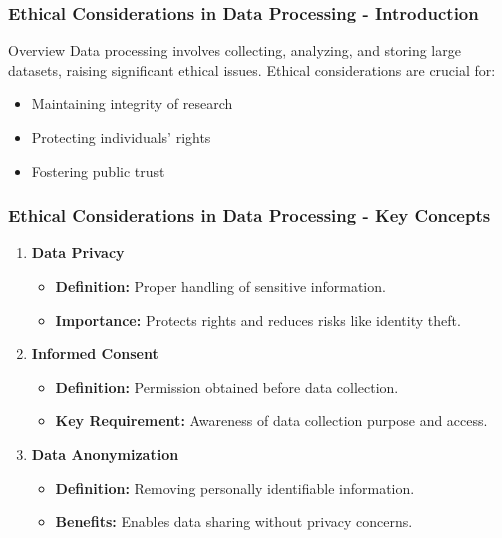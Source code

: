 \documentclass[aspectratio=169]{beamer}
\begin{document}
\begin{frame}[fragile]
    \frametitle{Ethical Considerations in Data Processing - Introduction}
    \begin{block}{Overview}
        Data processing involves collecting, analyzing, and storing large datasets, raising significant ethical issues. 
        Ethical considerations are crucial for:
        \begin{itemize}
            \item Maintaining integrity of research
            \item Protecting individuals’ rights
            \item Fostering public trust
        \end{itemize}
    \end{block}
\end{frame}

\begin{frame}[fragile]
    \frametitle{Ethical Considerations in Data Processing - Key Concepts}
    \begin{enumerate}
        \item \textbf{Data Privacy}
            \begin{itemize}
                \item \textbf{Definition:} Proper handling of sensitive information.
                \item \textbf{Importance:} Protects rights and reduces risks like identity theft.
            \end{itemize}
        
        \item \textbf{Informed Consent}
            \begin{itemize}
                \item \textbf{Definition:} Permission obtained before data collection.
                \item \textbf{Key Requirement:} Awareness of data collection purpose and access.
            \end{itemize}
        
        \item \textbf{Data Anonymization}
            \begin{itemize}
                \item \textbf{Definition:} Removing personally identifiable information.
                \item \textbf{Benefits:} Enables data sharing without privacy concerns.
            \end{itemize}
    \end{enumerate}
\end{frame}
\end{document}
